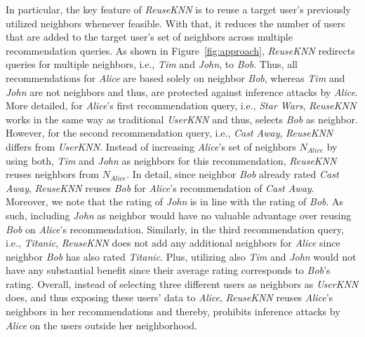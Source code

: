 \documentclass[manuscript,review,anonymous]{acmart}
\begin{document}
In particular, the key feature of \emph{ReuseKNN} is to reuse a target user's previously utilized neighbors whenever feasible.
With that, it reduces the number of users that are added to the target user's set of neighbors across multiple recommendation queries.
As shown in Figure~\ref{fig:approach}, \emph{ReuseKNN} redirects queries for multiple neighbors, i.e., \emph{Tim} and \emph{John}, to \emph{Bob}.
Thus, all recommendations for \emph{Alice} are based solely on neighbor \emph{Bob}, whereas \emph{Tim} and \emph{John} are not neighbors and thus, are protected against inference attacks by \emph{Alice}.
More detailed, for \emph{Alice}'s first recommendation query, i.e., \emph{Star Wars}, \emph{ReuseKNN} works in the same way as traditional \emph{UserKNN} and thus, selects \emph{Bob} as neighbor.
However, for the second recommendation query, i.e., \emph{Cast Away}, \emph{ReuseKNN} differs from \emph{UserKNN}.
Instead of increasing \emph{Alice}'s set of neighbors $N_{Alice}$ by using both, \emph{Tim} and \emph{John} as neighbors for this recommendation, \emph{ReuseKNN} reuses neighbors from $N_{Alice}$.
In detail, since neighbor \emph{Bob} already rated \emph{Cast Away}, \emph{ReuseKNN} reuses \emph{Bob} for \emph{Alice}'s recommendation of \emph{Cast Away}.
Moreover, we note that the rating of \emph{John} is in line with the rating of \emph{Bob}.
As such, including \emph{John} as neighbor would have no valuable advantage over reusing \emph{Bob} on \emph{Alice}'s recommendation.
Similarly, in the third recommendation query, i.e., \emph{Titanic}, \emph{ReuseKNN} does not add any additional neighbors for \emph{Alice} since neighbor \emph{Bob} has also rated \emph{Titanic}.
Plus, utilizing also \emph{Tim} and \emph{John} would not have any substantial benefit since their average rating corresponds to \emph{Bob}'s rating.
Overall, instead of selecting three different users as neighbors as \emph{UserKNN} does, and thus exposing these users' data to \emph{Alice}, \emph{ReuseKNN} reuses \emph{Alice}'s neighbors in her recommendations and thereby, prohibits inference attacks by \emph{Alice} on the users outside her neighborhood.
\end{document}
